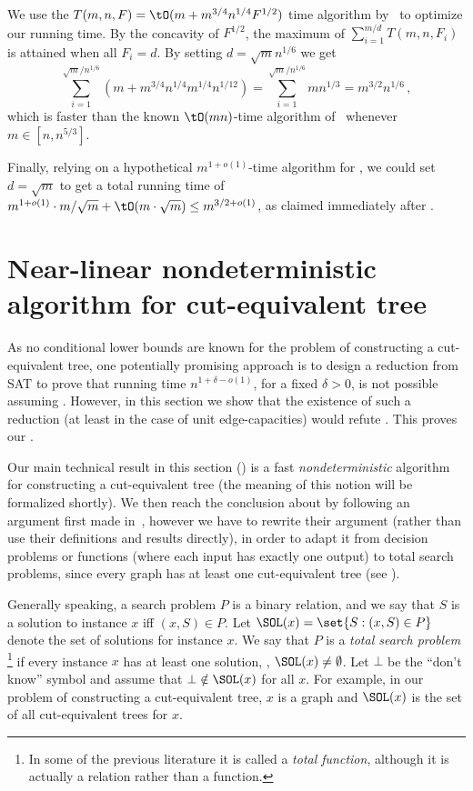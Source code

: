 We use the $T(m,n,F)=\tO(m+m^{3/4}n^{1/4}F^{1/2})$ time algorithm by~\cite{SidfordT18} to optimize our running time.
By the concavity of $F^{1/2}$, the maximum of $\sum_{i=1}^{m/d}T(m,n,F_i)$ is attained when all $F_i=d$.
By setting $d=\sqrt{m}n^{1/6}$ we get
\[
  \sum_{i=1}^{\sqrt{m}/n^{1/6}} (m+m^{3/4}n^{1/4}m^{1/4}n^{1/12})=
\sum_{i=1}^{\sqrt{m}/n^{1/6}} m n^{1/3}=
m^{3/2}n^{1/6}\,,
\]
which is faster than the known $\tO(mn)$-time algorithm of~\cite{BHKP07} whenever $m\in [n,n^{5/3}]$.

Finally, relying on a hypothetical $m^{1+o(1)}$-time algorithm for \MF,
we could set $d=\sqrt{m}$ to get a total running time of $m^{1+o(1)}\cdot m/\sqrt{m}+\tO(m\cdot \sqrt{m})\leq m^{3/2+o(1)}$, as claimed immediately after .



\section{Near-linear nondeterministic algorithm for cut-equivalent tree}\label{sec:nondet}

As no conditional lower bounds are known
for the problem of constructing a cut-equivalent tree,
one potentially promising approach is to design a reduction from SAT
to prove that running time $n^{1+\delta-o(1)}$, for a fixed $\delta>0$,
is not possible assuming \SETH.
However, in this section we show that the existence of such a reduction (at least in the case of unit edge-capacities) would refute \NSETH.
This proves our .


Our main technical result in this section ()
is a fast \emph{nondeterministic} algorithm
for constructing a cut-equivalent tree (the meaning of this notion will be formalized shortly).
We then reach the conclusion about \NSETH
by following an argument first made in~\cite{carmosino2016nondeterministic},
however we have to rewrite their argument
(rather than use their definitions and results directly),
in order to adapt it from decision problems or functions (where each input has exactly one output) to total search problems,
since every graph has at least one cut-equivalent tree (see ).

Generally speaking, a search problem $P$ is a binary relation,
and we say that $S$ is a solution to instance $x$ iff $(x,S)\in P$.
Let $\SOL(x)=\set{S: (x,S)\in P}$ denote the set of solutions for instance $x$.
We say that $P$ is a \emph{total search problem}%
\footnote{In some of the previous literature it is called a
\textit{total function}, although it is actually a relation rather than a function.}
if every instance $x$ has at least one solution, \ie, $\SOL(x)\neq \emptyset$.
Let $\bot$ be the ``don't know'' symbol and assume that $\bot \notin \SOL(x)$ for all $x$.
For example, in our problem of constructing a cut-equivalent tree,
$x$ is a graph and $\SOL(x)$ is the set of all cut-equivalent trees for $x$.

